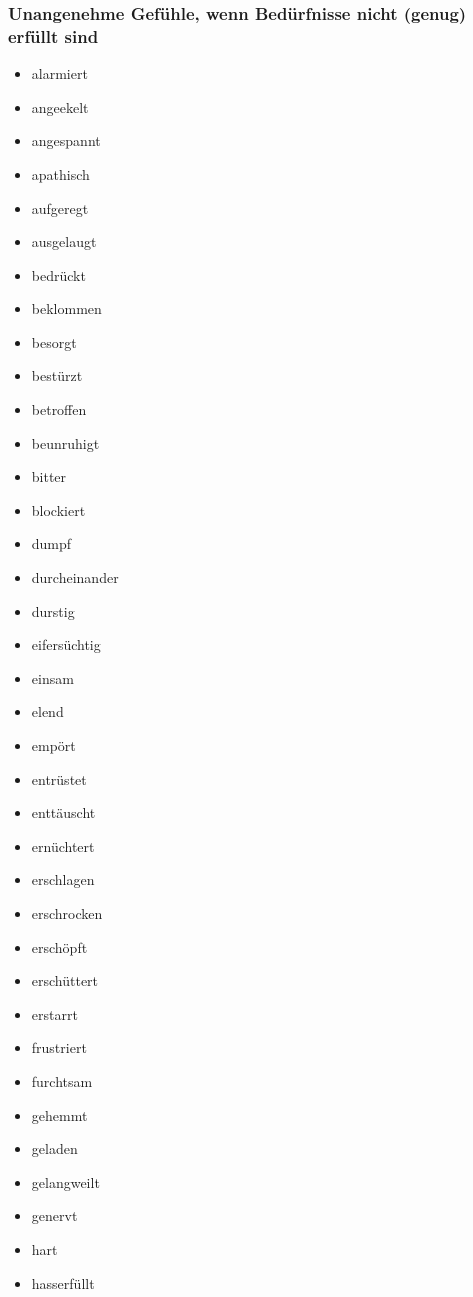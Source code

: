 \subsubsection{Unangenehme Gefühle, wenn Bedürfnisse nicht (genug) erfüllt sind}
\label{unangenehme-gefuehle}

\begin{multicols}{2}
  \begin{itemize}
    \item alarmiert
    \item angeekelt
    \item angespannt
    \item apathisch
    \item aufgeregt
    \item ausgelaugt
    \item bedrückt
    \item beklommen
    \item besorgt
    \item bestürzt
    \item betroffen
    \item beunruhigt
    \item bitter
    \item blockiert
    \item dumpf
    \item durcheinander
    \item durstig
    \item eifersüchtig
    \item einsam
    \item elend
    \item empört
    \item entrüstet
    \item enttäuscht
    \item ernüchtert
    \item erschlagen
    \item erschrocken
    \item erschöpft
    \item erschüttert
    \item erstarrt
    \item frustriert
    \item furchtsam
    \item gehemmt
    \item geladen
    \item gelangweilt
    \item genervt
    \item hart
    \item hasserfüllt

\end{itemize}
\end{multicols}
